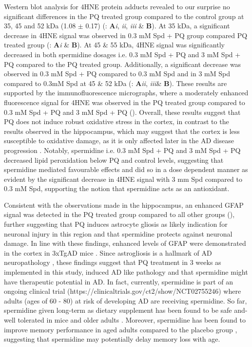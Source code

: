 Western blot analysis for 4HNE protein adducts revealed to our surprise no significant differences in the PQ treated group compared to the control group at 35, 45 and 52 kDa (1.08 $\pm$ 0.17) (: \textbf{A}\textit{i}, \textit{ii}, \textit{iii} \& \textbf{B}). At 35 kDa, a significant decrease in 4HNE signal was observed in 0.3 mM Spd + PQ group compared PQ treated group (: \textbf{A}\textit{i} \& \textbf{B}). At 45 \& 55 kDa, 4HNE signal was significantly decreased in both spermidine dosages i.e. 0.3 mM Spd + PQ and 3 mM Spd + PQ compared to the PQ treated group. Additionally, a significant decrease was observed in 0.3 mM Spd + PQ compared to 0.3 mM Spd and in 3 mM Spd compared to 0.3mM Spd at 45 \& 52 kDa (: \textbf{A}\textit{ii}, \textit{iii}\& \textbf{B}). These results are supported by the immunofluorescence micrographs, where a moderately enhanced fluorescence signal for 4HNE was observed in the PQ treated group compared to 0.3 mM Spd + PQ and 3 mM Spd + PQ (). Overall, these results suggest that PQ does not induce robust oxidative stress in the cortex, in contrast to the results observed in the hippocampus, which may suggest that the cortex is less susceptible to oxidative damage, as it is only affected later in the AD disease progression \citep{lumkwana2017}. Notably, spermidine i.e. 0.3 mM Spd + PQ and 3 mM Spd + PQ decreased lipid peroxidation below PQ and control levels, suggesting that spermidine mediated favourable effects and did so in a dose dependent manner as evident by the significant decrease in 4HNE signal with 3 mm Spd compared to 0.3 mM Spd, supporting the notion that spermidine acts as an antioxidant.

Consistent with the observations made in the hippocampus, an enhanced GFAP signal was detected in the PQ treated group compared to all other groups (), further suggesting that PQ induces astrocyte gliosis as likely indication for neuronal injury in this region and that spermidine protects against neuronal damage. In line with these findings, enhanced levels of GFAP were demonstrated in the cortex in 3xTgAD mice \citep{Kamphuis2014,Oddo2003}. Since astrogliosis is a hallmark of AD neuropathology \citep{Gotz2001,Grundke-Iqbal1989}, these findings suggest that PQ treatment in 3 weeks as implemented in this study, induced AD like pathology and that spermidine might have therapeutic potential in AD. In fact, currently, spermidine is part of an ongoing clinical trial (https://clinicaltrials.gov/ct2/show/NCT02755246) where adults (ages of 60 - 80) at risk of developing AD are receiving spermidine. So far, spermidine given long-term as dietary supplement has been found to be safe and-well tolerated in mice and older adults \citep{Schwarz2018}. Moreover, spermidine has been found to improve memory performance in aged adults compared to the placebo group \citep{Wirth2018}, suggesting that spermidine may potentially delay memory loss with age.

